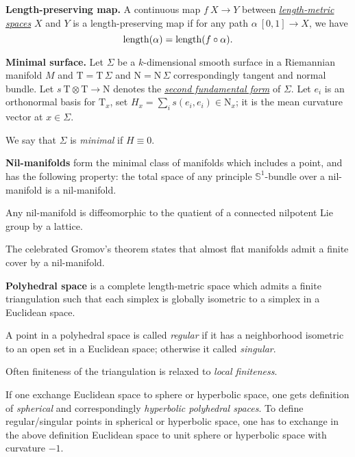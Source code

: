 \begin{description}
\item{\bf Length-preserving map.}\label{Length-preserving map} 
A continuous map $f\:X\to Y$ between 
\hyperref[Length-metric space]{\emph{length-metric spaces}} 
$X$ and $Y$ is a length-preserving map if for any path $\alpha\:[0,1]\to X$, we have 
$$\operatorname{\rm length}(\alpha)=\operatorname{\rm length}(f\circ\alpha).$$

\item{\bf Minimal surface.}\label{Minimal surface} 
Let $\Sigma$ be a $k$-dimensional smooth surface in
a Riemannian manifold $M$
and $\mathrm{T}=\mathrm{T}\,\Sigma$ and $\mathrm{N}=\mathrm{N}\,\Sigma$ correspondingly tangent and normal bundle.
Let $s\:\mathrm{T}\otimes \mathrm{T}\to \mathrm{N}$ denotes the \hyperref[Second fundamental form]{\emph{second fundamental form}} of $\Sigma$.
Let  $e_i$ is an orthonormal basis for $\mathrm{T}_x$, 
set $H_x=\sum_i s(e_i,e_i)\in \mathrm{N}_x$; 
it is the mean curvature vector at $x\in \Sigma$. 

We say that $\Sigma$ is \emph{minimal} if $H\equiv 0$.

\item{\bf Nil-manifolds}\label{Nil-manifolds} form the minimal class of manifolds which includes a point, and has the following property:  
the total space of any principle $\mathbb{S}^1$-bundle over a nil-manifold is a nil-manifold. 

Any nil-manifold is diffeomorphic to the quatient of a connected nilpotent Lie group by a lattice.

The celebrated Gromov's theorem states that almost flat manifolds admit a finite cover by a nil-manifold.



\item{\bf Polyhedral space}\label{Polyhedral space}
is a complete length-metric space which admits a finite triangulation 
such that each simplex is globally isometric to a simplex in a Euclidean space.

A point in a polyhedral space is called \emph{regular} if it has a neighborhood isometric to an open set in a Euclidean space;
otherwise it called \emph{singular}.

Often finiteness of the triangulation is relaxed to \emph{local finiteness}.

If one exchange Euclidean space to sphere or hyperbolic space,
one gets definition of \emph{spherical} and correspondingly \emph{hyperbolic polyhedral spaces}.
To define regular/singular points in spherical or hyperbolic space,
one has to exchange in the above definition Euclidean space to unit sphere or hyperbolic space with curvature $-1$.



\end{description}

